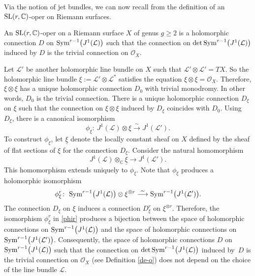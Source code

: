 \documentclass[pdftex]{sigma}
\numberwithin{equation}{section}
\begin{document}
Via the notion of jet bundles, we can now recall from
\cite{BD} the definition of an ${\rm SL}(r, {\mathbb C})$-oper on Riemann surfaces.

\begin{Definition}\label{de-o}
An ${\rm SL}(r, {\mathbb C})$-oper on a Riemann surface $X$ of genus
$g \geq 2$ is a holomorphic connection $D$ on
${\rm Sym}^{r-1}\bigl(J^1(\mathcal L)\bigr)$ such that the connection on $\det {\rm
Sym}^{r-1}\bigl(J^1(\mathcal L)\bigr)$ induced by $D$ is the trivial connection on ${\mathcal O}_X$.
\end{Definition}

\begin{Remark}\label{rem-th}
Let ${\mathcal L}'$ be another holomorphic line bundle on $X$ such that
${\mathcal L}'\otimes{\mathcal L}' = TX$. So the holomorphic line bundle $\xi := {\mathcal L}'\otimes {\mathcal L}^*$
satisfies the equation $\xi\otimes\xi = {\mathcal O}_X$. Therefore, $\xi\otimes\xi$ has a unique holomorphic connection
$D_0$ with trivial monodromy. In other words, $D_0$ is the trivial connection. There is a unique holomorphic connection $D_\xi$
on $\xi$ such that the connection on $\xi\otimes\xi$ induced by $D_\xi$ coincides with $D_0$. Using $D_\xi$, there is a canonical
isomorphism
\[
\phi_\xi\colon\ J^1({\mathcal L})\otimes\xi \stackrel{\sim}{\longrightarrow} J^1({\mathcal L}').
\]
To construct $\phi_\xi$, let $\underline{\xi}$ denote the locally constant sheaf on $X$ defined by the sheaf of flat sections of
$\xi$ for the connection $D_\xi$. Consider the natural homomorphism
\[
J^1({\mathcal L})\otimes_{\mathbb C}\underline{\xi} \longrightarrow J^1({\mathcal L}').
\]
This homomorphism extends uniquely to $\phi_\xi$. Note that $\phi_\xi$ produces a holomorphic isomorphism
\begin{gather}\label{phir}
\phi^r_\xi\colon\ {\rm Sym}^{r-1}\bigl(J^1({\mathcal L})\bigr)\otimes \xi^{\otimes r}
 \stackrel{\sim}{\longrightarrow} {\rm Sym}^{r-1}\bigl(J^1({\mathcal L}')\bigr).
\end{gather}
The connection $D_\xi$ on $\xi$ induces a connection $D^r_\xi$ on $\xi^{\otimes r}$. Therefore, the isomorphism $\phi^r_\xi$ in
\eqref{phir} produces a bijection between the space of holomorphic connections on ${\rm Sym}^{r-1}\bigl(J^1({\mathcal L})\bigr)$
and the space of holomorphic connections on ${\rm Sym}^{r-1}\bigl(J^1({\mathcal L}')\bigr)$. Consequently,
the space of holomorphic connections $D$ on ${\rm Sym}^{r-1}\bigl(J^1(\mathcal L)\bigr)$ such that the connection on $\det {\rm
Sym}^{r-1}\bigl(J^1(\mathcal L)\bigr)$ induced by~$D$ is the trivial connection on ${\mathcal O}_X$
(see Definition \ref{de-o}) does not depend on the choice of the line bundle $\mathcal L$.
\end{Remark}
\end{document}
